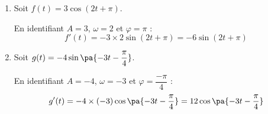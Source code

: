 \begin{ex}
	\nline
	\begin{enumerate}
		\item Soit $f(t) = 3 \cos(2t + \pi)$.

		      En identifiant $A = 3$, $\omega = 2$ et $\varphi = \pi$ :
		      \[
			      f'(t) = -3 \times 2 \sin(2t + \pi) = -6 \sin(2t + \pi)
		      \]
		\item Soit $g(t) = -4 \sin\pa{-3t - \dfrac{\pi}{4}}$.

		      En identifiant $A = -4$, $\omega = -3$ et $\varphi = \dfrac{-\pi}{4}$ :
		      \[
			      g'(t) = -4 \times (-3) \cos\pa{-3t - \dfrac{\pi}{4}} = 12 \cos\pa{-3t - \dfrac{\pi}{4}}
		      \]
	\end{enumerate}
\end{ex}
